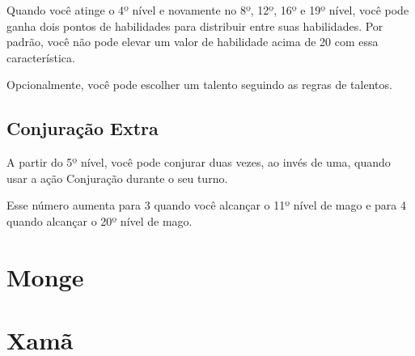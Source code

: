 \documentclass{RPG_Adventure}[2021/10/20]
\begin{document}
\begin{multicols}{2}
Quando você atinge o 4º nível e novamente no 8º, 12º, 16º e 19º nível, você pode
ganha dois pontos de habilidades para distribuir entre suas habilidades. Por
padrão, você não pode elevar um valor de habilidade acima de 20 com essa
característica.

Opcionalmente, você pode escolher um talento seguindo as regras de talentos.

\section*{Conjuração Extra}%

A partir do 5º nível, você pode conjurar duas vezes, ao invés de uma, quando
usar a ação Conjuração durante o seu turno.

Esse número aumenta para 3 quando você alcançar o 11º nível de mago e para 4
quando alcançar o 20º nível de mago.
\end{multicols}


\chapter{Monge}%
\label{cha:monge}
\begin{multicols}{2}
\end{multicols}


\chapter{Xamã}%
\label{cha:xama}
\begin{multicols}{2}
\end{multicols}
\end{document}
